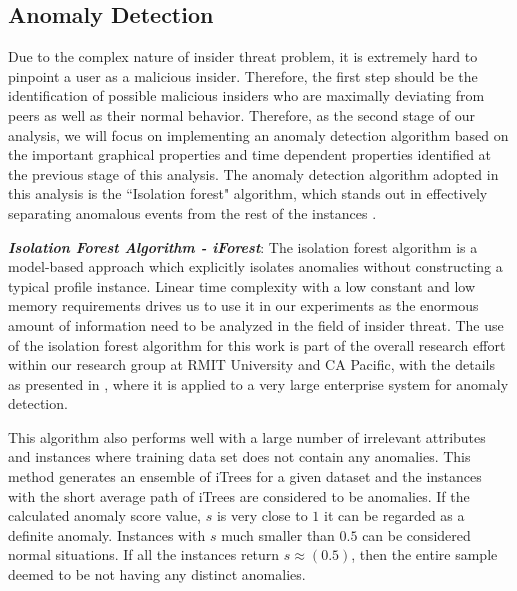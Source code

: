 \documentclass[conference,draftclsnofoot,onecolumn]{IEEEtran}%
\begin{document}
\subsection{Anomaly Detection}
Due to the complex nature of insider threat problem, it is extremely hard to pinpoint a user as a malicious insider. Therefore, the first step should be the identification of possible malicious insiders who are maximally deviating from peers as well as their normal behavior. Therefore, as the second stage of our analysis, we will focus on implementing an anomaly detection algorithm based on the important graphical properties and time dependent properties identified at the previous stage of this analysis. The anomaly detection algorithm adopted in this analysis is the ``Isolation forest" algorithm, which stands out in effectively separating anomalous events from the rest of the instances \cite{IForest}. 

\textbf{\textit{Isolation Forest Algorithm - iForest}}:
The isolation forest algorithm is a model-based approach which explicitly isolates anomalies without constructing a typical profile instance. Linear time complexity with a low constant and low memory requirements drives us to use it in our experiments as the enormous amount of information need to be analyzed in the field of insider threat. The use of the isolation forest algorithm for this work is part of the overall research effort within our research group  at RMIT University and CA Pacific, with the details as presented in \cite{Li2016}, where it is applied to a very large enterprise system for anomaly detection. 

This algorithm also performs well with a large number of irrelevant attributes and instances where training data set does not contain any anomalies. This method generates an ensemble of iTrees for a given dataset and the instances with the short average path of iTrees are considered to be anomalies. If the calculated anomaly score value, $s$ is very close to $1$ it can be regarded as a definite anomaly. Instances with $s$ much smaller than $0.5$ can be considered normal situations. If all the instances return $s \approx(0.5)$, then the entire sample deemed to be not having any distinct anomalies.
\end{document}
